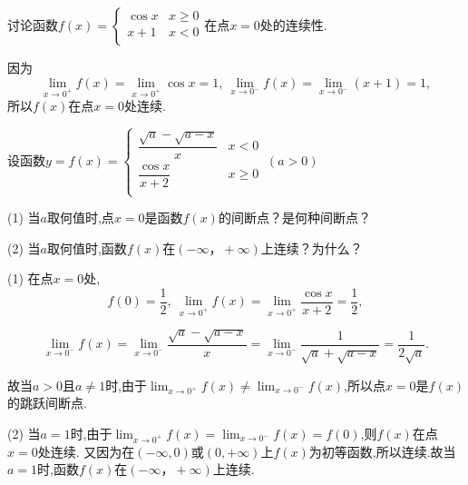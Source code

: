 \begin{problem}讨论函数$f(x) =  \begin{cases}
	\cos x & x \geq 0 \\
	x + 1 & x < 0 \\
	\end{cases} $在点$x = 0$处的连续性.
	
	\begin{solution} 
		因为
		$$\lim_{x \rightarrow 0^{+}}f(x) = \lim_{x \rightarrow 0^{+}}\cos x = 1,\ \lim_{x \rightarrow 0^{-}}f(x) = \lim_{x \rightarrow 0^{-}}(x + 1) = 1,$$
		所以$f(x)$在点$x = 0$处连续.
	\end{solution}

\end{problem}           


\begin{problem}设函数$\displaystyle y = f\left( x \right) = \begin{cases}
	\dfrac{\sqrt{a} - \sqrt{a - x}}{x} & x < 0 \\
	\dfrac{\cos x}{x + 2} & x \geq 0 \\
	\end{cases} \ \left( a > 0 \right)$
	
	(1) 当$a$取何值时,点$x = 0$是函数$f\left( x \right)$的间断点？是何种间断点？
	
	(2) 当$a$取何值时,函数$f\left( x \right)$在$\left( - \infty ， + \infty \right)$上连续？为什么？
	
	\begin{solution}(1) 在点$x = 0$处,$$f(0) = \frac{1}{2},\ \lim_{x \rightarrow 0^{+}}f(x) = \lim_{x \rightarrow 0^{+}}\frac{\cos x}{x + 2} = \frac{1}{2},$$
		
		$$\lim_{x \rightarrow 0^{-}}f(x) = \lim_{x \rightarrow 0^{-}}\frac{\sqrt{a} - \sqrt{a - x}}{x} = \lim_{x \rightarrow 0^{-}}\frac{1}{\sqrt{a} + \sqrt{a - x}} = \frac{1}{2\sqrt{a}}.$$
		
	故当$a > 0$且$a \neq 1$时,由于$\displaystyle \lim_{x \rightarrow 0^{+}}f(x) \neq \lim_{x \rightarrow 0^{-}}f(x)$,所以点$x = 0$是$f\left( x \right)$的跳跃间断点.
		
		(2) 当$a = 1$时,由于$\displaystyle \lim_{x \rightarrow 0^{+}}f(x) = \lim_{x \rightarrow 0^{-}}f(x) = f(0)$,则$f\left( x \right)$在点$x = 0$处连续. 又因为在$( - \infty,0)$或$(0, + \infty)$上$f\left( x \right)$为初等函数,所以连续.故当$a = 1$时,函数$f\left( x \right)$在$\left( - \infty ， + \infty \right)$上连续.
		
	\end{solution}

\end{problem}           



